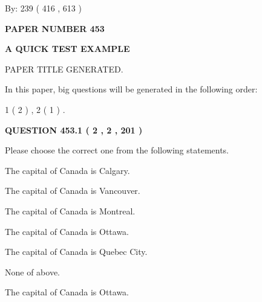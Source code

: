 \documentclass[12pt]{article}
\begin{document}
   
\hspace{1.0in} By: 
 239 ( 416 ,  613 )
   
   
   
   
\newpage 
\setcounter{page}{ 
   453001 } 
   
   
   
   
 {\textbf{ \Large{ PAPER NUMBER  453  }}}
   
   
\vspace{0.2in}
   
   
   
   
   
   
   
   
 \vspace{0.2in}
{\LARGE {\textbf{ A QUICK TEST EXAMPLE}}}
   
   
 PAPER TITLE GENERATED.
   
   
   
\vspace{0.2in}
   
In this paper, big questions will be generated in the following order: 
   
   
   1 ( 2 )
 ,
   2 ( 1 )
 .
  
\vspace{0.2in}
  
{\textbf{\Large{QUESTION
453.1 
 ( 2 , 2 , 201 )
}}}
  
  
Please choose the correct one from the following statements.
 
 
The capital of Canada is Calgary.
 
 
The capital of Canada is Vancouver.
 
 
The capital of Canada is Montreal.
 
 
The capital of Canada is Ottawa.
 
 
The capital of Canada is Quebec City.
 
 
 None of above.
 
 
\noindent{}
 
 
The capital of Canada is Ottawa.
 
 
\noindent{}
 
\end{document}
